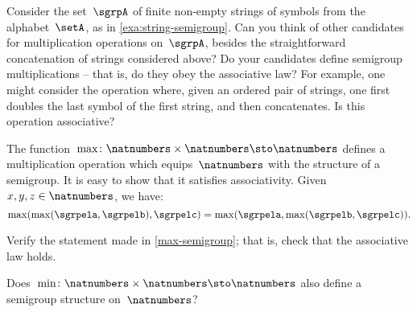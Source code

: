 \begin{gradedexercise}
  \label{ex:alphabet}
  Consider the set~$\sgrpA$ of finite non-empty strings of symbols from the alphabet~$\setA$, as in \cref{exa:string-semigroup}.
  Can you think of other candidates for multiplication operations on~$\sgrpA$, besides the straightforward concatenation of strings considered above?
  Do your candidates define semigroup multiplications -- that is, do they obey the associative law?
  For example, one might consider the operation where, given an ordered pair of strings, one first doubles the last symbol of the first string, and then concatenates.
  Is this operation associative?
\end{gradedexercise}
\begin{solution}
\end{solution}


\begin{example}
  \label{max-semigroup}
  The function~$\max \colon \natnumbers \times \natnumbers \sto \natnumbers$ defines a multiplication operation which equips~$\natnumbers$ with the structure of a semigroup.
  It is easy to show that it satisfies associativity. Given~$x,y,z\in \natnumbers$, we have:
  \begin{equation*}
    \label{eq:max-assoc}
    \max(\max(\sgrpela,\sgrpelb),\sgrpelc)=\max(\sgrpela,\max(\sgrpelb,\sgrpelc)).
  \end{equation*}
\end{example}

\begin{exercise}
  \label{ex:max-semigroup}
  Verify the statement made in \cref{max-semigroup}; that is, check that the associative law holds.

  Does~$\min \colon \natnumbers \times \natnumbers \sto \natnumbers$ also define a semigroup structure on~$\natnumbers$?
\end{exercise}
\begin{solution}
\end{solution}


